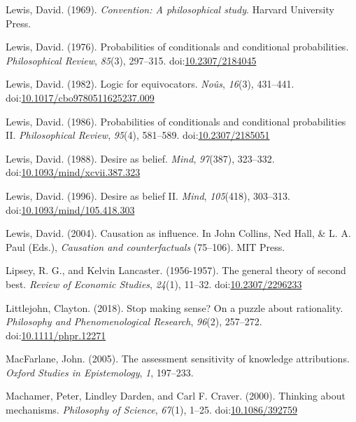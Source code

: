 \documentclass[
  10pt,
  letterpaper,
  twoside]{scrbook}
\newlength{\cslhangindent}
\newenvironment{CSLReferences}[2] %
 {\begin{list}{}{%
  \setlength{\itemindent}{0pt}
  \setlength{\leftmargin}{0pt}
  \setlength{\parsep}{0pt}
  \ifodd #1
   \setlength{\leftmargin}{\cslhangindent}
   \setlength{\itemindent}{-1\cslhangindent}
  \fi
  \setlength{\itemsep}{#2\baselineskip}}}
 {\end{list}}
\begin{document}
\begin{CSLReferences}{1}{0}
Lewis, David. (1969). \emph{Convention: A philosophical study}. Harvard
University Press.

Lewis, David. (1976). Probabilities of conditionals and conditional
probabilities. \emph{Philosophical Review}, \emph{85}(3), 297--315.
doi:\href{https://doi.org/10.2307/2184045}{10.2307/2184045}

Lewis, David. (1982). Logic for equivocators. \emph{No{û}s},
\emph{16}(3), 431--441.
doi:\href{https://doi.org/10.1017/cbo9780511625237.009}{10.1017/cbo9780511625237.009}

Lewis, David. (1986). Probabilities of conditionals and conditional
probabilities {II}. \emph{Philosophical Review}, \emph{95}(4), 581--589.
doi:\href{https://doi.org/10.2307/2185051}{10.2307/2185051}

Lewis, David. (1988). Desire as belief. \emph{Mind}, \emph{97}(387),
323--332.
doi:\href{https://doi.org/10.1093/mind/xcvii.387.323}{10.1093/mind/xcvii.387.323}

Lewis, David. (1996). Desire as belief {II}. \emph{Mind},
\emph{105}(418), 303--313.
doi:\href{https://doi.org/10.1093/mind/105.418.303}{10.1093/mind/105.418.303}

Lewis, David. (2004). Causation as influence. In John Collins, Ned Hall,
\& L. A. Paul (Eds.), \emph{Causation and counterfactuals} (75--106).
{MIT} Press.

Lipsey, R. G., and Kelvin Lancaster. (1956-1957). The general theory of
second best. \emph{Review of Economic Studies}, \emph{24}(1), 11--32.
doi:\href{https://doi.org/10.2307/2296233}{10.2307/2296233}

Littlejohn, Clayton. (2018). Stop making sense? On a puzzle about
rationality. \emph{Philosophy and Phenomenological Research},
\emph{96}(2), 257--272.
doi:\href{https://doi.org/10.1111/phpr.12271}{10.1111/phpr.12271}

MacFarlane, John. (2005). The assessment sensitivity of knowledge
attributions. \emph{Oxford Studies in Epistemology}, \emph{1}, 197--233.

Machamer, Peter, Lindley Darden, and Carl F. Craver. (2000). Thinking
about mechanisms. \emph{Philosophy of Science}, \emph{67}(1), 1--25.
doi:\href{https://doi.org/10.1086/392759}{10.1086/392759}


\end{CSLReferences}
\end{document}
